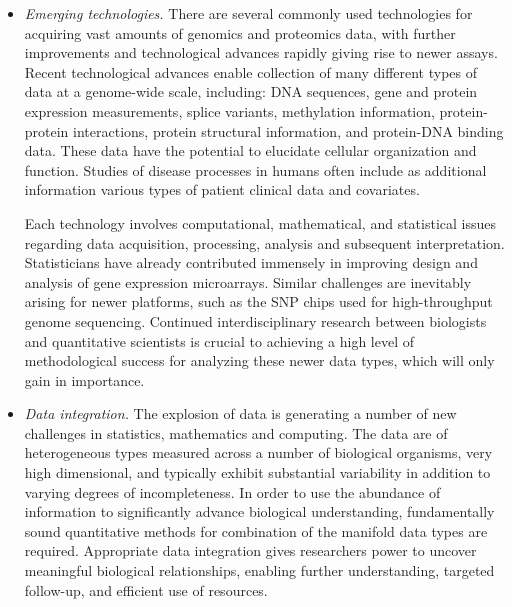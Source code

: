 \documentclass[12pt]{amsart}
\begin{document}
\begin{itemize}


\item \textit{Emerging technologies.}  
There are several commonly used technologies for
acquiring vast amounts of genomics and proteomics data, 
with further improvements and technological advances
rapidly giving rise to newer assays.
Recent technological advances enable collection of
many different types of data at a genome-wide scale, including: 
DNA sequences, gene and protein expression measurements, splice variants, methylation information,  
protein-protein interactions, protein structural information, 
and protein-DNA binding data. 
These data have the potential to elucidate cellular 
organization and function. 
Studies of disease processes in humans often include as additional
information various types of patient clinical data and covariates.

Each technology involves computational, mathematical, 
and statistical issues regarding data acquisition, 
processing, analysis and subsequent interpretation.
Statisticians have already contributed immensely in 
improving design and analysis of gene expression microarrays.
Similar challenges are inevitably arising
for newer platforms, such as the SNP chips used for high-throughput
genome sequencing.
Continued interdisciplinary research between biologists and quantitative
scientists is crucial to  
achieving a high level of methodological success
for analyzing these newer data types, 
which will only gain in importance.



\item \textit{Data integration.}  
The explosion of data is generating a number
of new challenges in statistics, mathematics and computing.
The data are of heterogeneous types measured across a number of biological organisms, very high dimensional,
and typically exhibit substantial variability in addition
to varying degrees of incompleteness.
In order to use the abundance of information
to significantly advance biological understanding, 
fundamentally sound quantitative methods for combination
of the manifold data types are required.
Appropriate data integration gives researchers power
to uncover meaningful biological relationships, 
enabling further understanding, targeted follow-up, and
efficient use of resources.


\end{itemize}
\end{document}
